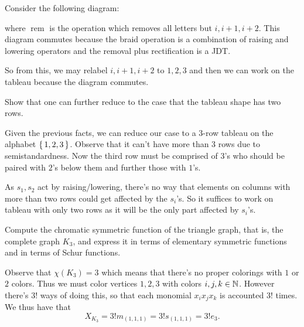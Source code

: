 \documentclass[12pt]{memoir}
\begin{document}
\begin{ptcbr}
Consider the following diagram:
\begin{center}
\end{center}
where $\operatorname{rem}$ is the operation which removes all letters but $i,i+1,i+2$. This diagram commutes because the braid operation is a combination of raising and lowering operators and the removal plus rectification is a JDT.\par
So from this, we may relabel $i,i+1,i+2$ to $1,2,3$ and then we can work on the tableau because the diagram commutes.
\end{ptcbr}

\begin{Ej}[Exercise 1.d]
    Show that one can further reduce to the case that the tableau shape has two rows.
\end{Ej}

\begin{ptcbr}
    Given the previous facts, we can reduce our case to a $3$-row tableau on the alphabet $\{\,1,2,3\,\}$. Observe that it can't have more than $3$ rows due to semistandardness. Now the third row must be comprised of $3$'s who should be paired with $2$'s below them and further those with $1$'s.\par
    As $s_1,s_2$ act by raising/lowering, there's no way that elements on columns with more than two rows could get affected by the $s_i$'s. So it suffices to work on tableau with only two rows as it will be the only part affected by $s_i$'s.
\end{ptcbr}

\begin{Ej}[Exercise 2]
    Compute the chromatic symmetric function of the triangle graph, that is, the complete graph $K_3$, and express it in terms of elementary symmetric functions and in terms of Schur functions.
\end{Ej}

\begin{ptcbr}
Observe that $\chi(K_3)=3$ which means that there's no proper colorings with $1$ or $2$ colors. Thus we must color vertices $1,2,3$ with colors $i,j,k\in\mathbb{N}$. However there's $3!$ ways of doing this, so that each monomial $x_ix_jx_k$ is accounted $3!$ times. We thus have that 
$$X_{K_3}=3!m_{(1,1,1)}=3!s_{(1,1,1)}=3!e_3.$$
\end{ptcbr}
\end{document}
